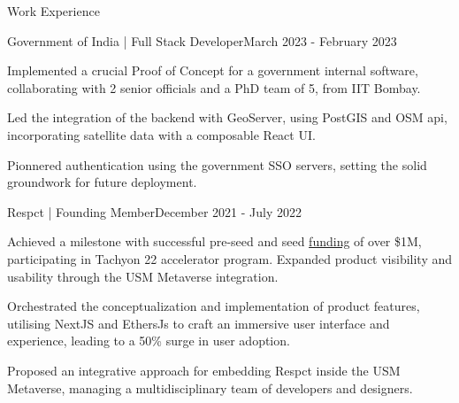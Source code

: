 \documentclass[10pt]{resume}
\begin{document}
\begin{rSection}{Work Experience}
        \begin{rSubsection}{Government of India | Full Stack Developer}{March 2023 - February 2023}
            \item Implemented a crucial Proof of Concept for a government \vspace{-0.3em} internal software, collaborating with 2 senior  officials and a PhD team of 5, from IIT Bombay. 
            \item Led the integration of the backend with \vspace{-0.3em} GeoServer, using PostGIS and OSM api, incorporating satellite data with a composable React UI.
            \item Pionnered authentication using the government SSO servers, setting the solid groundwork for future deployment.
        \end{rSubsection}
    
    
    	\begin{rSubsection}{Respct | Founding Member}{December 2021 - July 2022}
                \item Achieved a milestone with successful pre-seed and seed \href{https://inc42.com/buzz/meet-the-31-web3-startups-that-are-part-of-first-cohort-of-polygonleap-2021/}{funding} of over \$1M, participating in Tachyon 22 \vspace{-0.3em} accelerator program. Expanded product visibility and usability through the USM Metaverse integration.
               \item Orchestrated the conceptualization and implementation \vspace{-0.3em} of product features, utilising NextJS and EthersJs to craft an immersive user interface and experience, leading to a 50\% surge in user adoption.
                \item Proposed an integrative approach for embedding Respct \vspace{-0.3em} inside the USM Metaverse, managing a multidisciplinary team of developers and designers. 
    	\end{rSubsection}
    
    \end{rSection}
    
\end{document}
